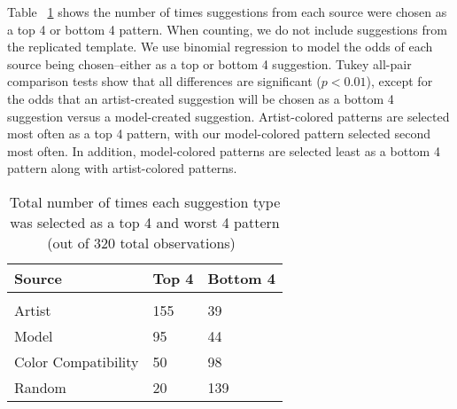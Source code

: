 
Table ~\ref{table:study} shows the number of times suggestions from each source were chosen as a top 4 or bottom 4 pattern. When counting, we do not include suggestions from the replicated template. We use binomial regression to model the odds of each source being chosen--either as a top or bottom 4 suggestion. Tukey all-pair comparison tests show that all differences are significant ($p < 0.01$), except for the odds that an artist-created suggestion will be chosen as a bottom 4 suggestion versus a model-created suggestion. Artist-colored patterns are selected most often as a top 4 pattern, with our model-colored pattern selected second most often. In addition, model-colored patterns are selected least as a bottom 4 pattern along with artist-colored patterns.


\begin{table}[h!]
  \begin{center}
\begin{tabular}{l| l l}
  \hline
\textbf{Source} & \textbf{Top 4} & \textbf{Bottom 4} \\
  \hline \\[-1.0em]
Artist & 155 & 39\\
Model & 95 & 44 \\
Color Compatibility & 50 & 98  \\
Random & 20 & 139 \\
\hline
\end{tabular}
\end{center}
\caption{Total number of times each suggestion type was selected as a top 4 and worst 4 pattern (out of 320 total observations)~}

 \label{table:study}
\end{table}